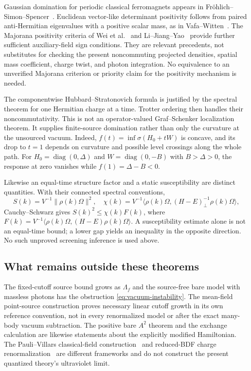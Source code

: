 Gaussian domination for periodic classical ferromagnets appears in
Fr\"ohlich--Simon--Spencer~\cite{FSS}. Euclidean vector-like
determinant positivity follows from paired anti-Hermitian eigenvalues
with a positive scalar mass, as in Vafa--Witten~\cite{VafaWitten}.
The Majorana positivity criteria of Wei et al.~\cite{Wei} and
Li--Jiang--Yao~\cite{LiJiangYao} provide further sufficient
auxiliary-field sign conditions. They are relevant precedents,
not substitutes for checking the present noncommuting projected
densities, spatial mass coefficient, charge twist, and photon integration.
No equivalence to an unverified Majorana criterion or priority claim
for the positivity mechanism is needed.

The componentwise Hubbard--Stratonovich formula is justified by the
spectral theorem for one Hermitian charge at a time. Trotter ordering
then handles their noncommutativity. This is not an operator-valued
Graf--Schenker localization theorem. It supplies finite-source
domination rather than only the curvature at the unsourced vacuum.
Indeed, $f(t)=\inf\sigma(H_0+tW)$ is concave, and its drop to
$t=1$ depends on curvature and possible level crossings along the
whole path. For $H_0=\operatorname{diag}(0,\Delta)$ and
$W=\operatorname{diag}(0,-B)$ with $B>\Delta>0$, the response
at zero vanishes while $f(1)=\Delta-B<0$.

Likewise an equal-time structure factor and a static susceptibility
are distinct quantities. With their connected spectral conventions,
\[
 S(k)=V^{-1}\|\rho(k)\Omega\|^2,\quad
 \chi(k)=V^{-1}\langle\rho(k)\Omega,(H-E)^{-1}_{\perp}
                         \rho(k)\Omega\rangle,
\]
Cauchy--Schwarz gives $S(k)^2\le\chi(k)F(k)$, where
$F(k)=V^{-1}\langle\rho(k)\Omega,(H-E)\rho(k)\Omega\rangle$.
A susceptibility estimate alone is not an equal-time bound; a lower
gap yields an inequality in the opposite direction. No such unproved
screening inference is used above.

\subsection{What remains outside these theorems}
The fixed-cutoff source bound grows as $\Lambda_f$ and the source-free
bare model with massless photons has the obstruction
\eqref{eq:vacuum-instability}. The mean-field point-source construction
proves necessary linear cutoff growth in its own reference convention,
not in every renormalized model or after the exact many-body vacuum
subtraction. The positive bare $A^2$ theorem and the exchange calculation
are likewise statements about the explicitly modified Hamiltonian.
The Pauli--Villars classical-field construction~\cite{GHLS2013} and
reduced-BDF charge renormalization~\cite{GLS2009} are different
frameworks and do not construct the present quantized theory's
ultraviolet limit.

